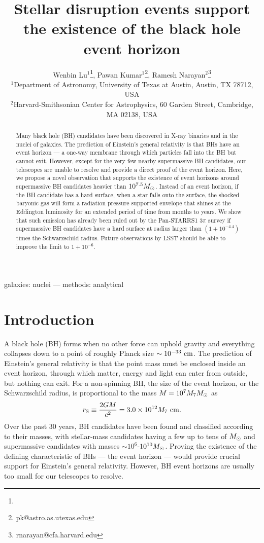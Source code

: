 \documentclass[useAMS,usenatbib]{mn2e}
\title[stellar disruptions and the black hole event horizon]{Stellar
  disruption events support the existence of the black hole event
  horizon}
\author[Lu, Kumar, \& Narayan]
  {Wenbin Lu$^1$\thanks{\myemail},
  Pawan Kumar$^1$\thanks{pk@astro.as.utexas.edu},
  Ramesh Narayan$^2$\thanks{rnarayan@cfa.harvard.edu}\\
  $^1$Department of Astronomy, University of Texas at Austin, Austin,
TX 78712, USA\\
  $^2$Harvard-Smithsonian Center for Astrophysics, 60 Garden Street,
  Cambridge, MA 02138, USA}
\begin{document}
\label{firstpage}
\maketitle

\begin{abstract}
Many black hole (BH) candidates have been discovered in X-ray
binaries and in the nuclei of galaxies. The prediction of Einstein's
general relativity is that BHs have an event horizon
--- a one-way membrane through which particles fall into the BH but
cannot exit. However, except for the very few nearby supermassive BH
candidates, our telescopes are unable to resolve and 
provide a direct proof of the event horizon. Here, we 
propose a novel observation that supports the existence
of event horizons around supermassive BH candidates 
heavier than $10^{7.5}M_{\rm \odot}$. Instead of
an event horizon, if the BH candidate has a hard surface, when a star
falls onto the surface, the shocked baryonic gas will form a radiation 
pressure supported envelope that shines at the Eddington
luminosity for an extended period of time from months to years. We
show that such emission has already been ruled out by 
the Pan-STARRS1 3$\pi$ survey if supermassive BH 
candidates have a hard surface at radius larger than $(1 +10^{-4.4})$
times the Schwarzschild radius. Future observations by LSST should be
able to improve the limit to $1 +10^{-6}$.
\end{abstract}

\begin{keywords}
galaxies: nuclei --- methods: analytical
\end{keywords}

\section{Introduction}\label{sec:intro}
A black hole (BH) forms when no other force can uphold gravity and
everything collapses down to a point of roughly Planck size $\sim 
10^{-33}\rm\ cm$. The prediction of Einstein's
general relativity is that the point mass must be enclosed inside an
event horizon, through which matter, energy and light can enter from
outside, but nothing can exit. For a non-spinning BH, the size of the event
horizon, or the Schwarzschild radius, is
proportional to the mass $M = 10^7 M_7M_{\rm \odot} $ as 
\begin{equation}
  \label{eq:2}
      r_{\rm S} \equiv \frac{2GM}{c^2} = 3.0 \times10^{12} M_7 \rm\ cm.
\end{equation}
Over the past 30 years, BH candidates have been found and classified 
according to their masses, with stellar-mass candidates having a few up to
tens of $M_{\rm \odot}$ and supermassive candidates with masses
$\sim10^6$-$10^{10}M_{\rm \odot}$. Proving the existence of the defining 
characteristic of BHs  --- the event horizon --- would provide crucial
support for Einstein's general relativity. However, BH event horizons
are usually too small for our telescopes to resolve. 
\end{document}
